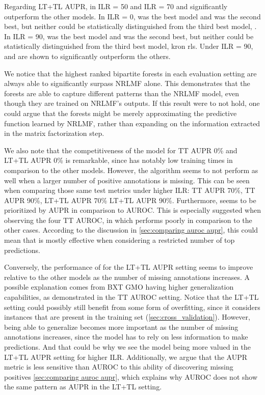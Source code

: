 Regarding LT+TL AUPR, in ILR = 50 and ILR = 70  and  significantly outperform the other models. In ILR = 0,  was the best model and  was the second best, but neither could be statistically distinguished from the third best model, . In ILR = 90,  was the best model and  was the second best, but neither could be statistically distinguished from the third best model, kron rls. Under ILR = 90,  and  are shown to significantly outperform the others.

We notice that the highest ranked bipartite forests in each evaluation setting are always able to significantly surpass NRLMF alone. This demonstrates that the forests are able to capture different patterns than the NRLMF model, even though they are trained on NRLMF's outputs. If this result were to not hold, one could argue that the forests might be merely approximating the predictive function learned by NRLMF, rather than expanding on the information extracted in the matrix factorization step.

We also note that the competitiveness of the  model for TT AUPR 0\% and LT+TL AUPR 0\% is remarkable, since  has notably low training times in comparison to the other models.  %
However, the algorithm seems to not perform as well when a larger number of positive annotations is missing. This can be seen when comparing those same test metrics under higher ILR: TT AUPR 70\%, TT AUPR 90\%, LT+TL AUPR 70\% LT+TL AUPR 90\%.
Furthermore,  seems to be prioritized by AUPR in comparison to AUROC. This is especially suggested when observing the four TT AUROC, in which  performs poorly in comparison to the other cases.
According to the discussion in \autoref{sec:comparing auroc aupr}, this could mean that  is mostly effective when considering a restricted number of top predictions.

Conversely, the performance of  for the LT+TL AUPR setting seems to improve relative to the other models as the number of missing annotations increases. A possible explanation comes from BXT GMO having higher generalization capabilities, as demonstrated in the TT AUROC setting. Notice that the LT+TL setting could possibly still benefit from some form of overfitting, since it considers instances that are present in the training set (\autoref{sec:cross_validation}). However, being able to generalize becomes more important as the number of missing annotations increases, since the model has to rely on less information to make predictions. And that could be why we see the  model being more valued in the LT+TL AUPR setting for higher ILR.
Additionally, we argue that the AUPR metric is less sensitive than AUROC to this ability of discovering missing positives \autoref{sec:comparing auroc aupr}, which explains why AUROC does not show the same pattern as AUPR in the LT+TL setting.

